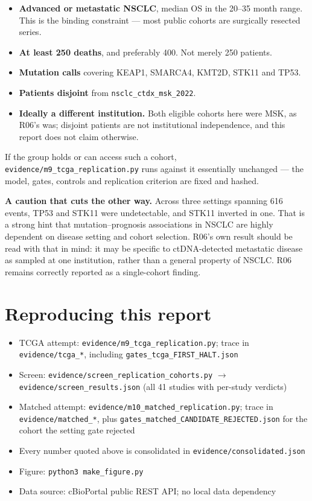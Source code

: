 \documentclass[11pt,a4paper]{article}
\begin{document}
\begin{itemize}[leftmargin=1.2em,itemsep=2pt]
\item \textbf{Advanced or metastatic NSCLC}, median OS in the 20--35 month range. This is the
      binding constraint --- most public cohorts are surgically resected series.
\item \textbf{At least 250 deaths}, and preferably 400. Not merely 250 patients.
\item \textbf{Mutation calls} covering KEAP1, SMARCA4, KMT2D, STK11 and TP53.
\item \textbf{Patients disjoint} from \texttt{nsclc\_ctdx\_msk\_2022}.
\item \textbf{Ideally a different institution.} Both eligible cohorts here were MSK, as R06's
      was; disjoint patients are not institutional independence, and this report does not claim
      otherwise.
\end{itemize}

If the group holds or can access such a cohort, \texttt{evidence/m9\_tcga\_replication.py} runs
against it essentially unchanged --- the model, gates, controls and replication criterion are
fixed and hashed.

\textbf{A caution that cuts the other way.} Across three settings spanning 616 events, TP53 and
STK11 were undetectable, and STK11 inverted in one. That is a strong hint that
mutation--prognosis associations in NSCLC are highly dependent on disease setting and cohort
selection. R06's own result should be read with that in mind: it may be specific to
ctDNA-detected metastatic disease as sampled at one institution, rather than a general property
of NSCLC. R06 remains correctly reported as a single-cohort finding.

\section{Reproducing this report}

\begin{itemize}[leftmargin=1.2em,itemsep=1pt]
\item TCGA attempt: \texttt{evidence/m9\_tcga\_replication.py}; trace in
      \texttt{evidence/tcga\_*}, including \texttt{gates\_tcga\_FIRST\_HALT.json}
\item Screen: \texttt{evidence/screen\_replication\_cohorts.py} $\rightarrow$
      \texttt{evidence/screen\_results.json} (all 41 studies with per-study verdicts)
\item Matched attempt: \texttt{evidence/m10\_matched\_replication.py}; trace in
      \texttt{evidence/matched\_*}, plus
      \texttt{gates\_matched\_CANDIDATE\_REJECTED.json} for the cohort the setting gate rejected
\item Every number quoted above is consolidated in \texttt{evidence/consolidated.json}
\item Figure: \texttt{python3 make\_figure.py}
\item Data source: cBioPortal public REST API; no local data dependency
\end{itemize}
\end{document}
